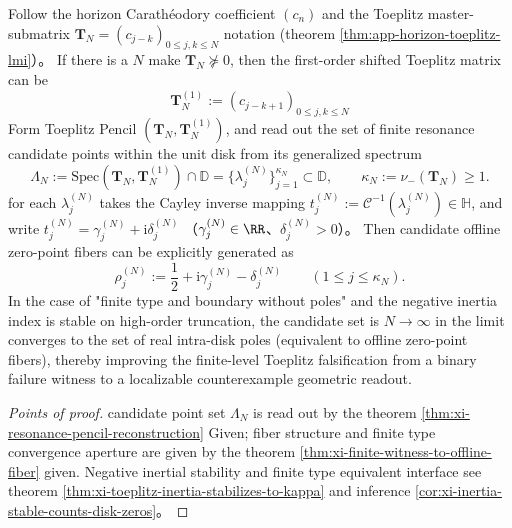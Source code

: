 \begin{conclusion}\label{con:xi-finite-falsifier-offline-fiber-readout}
Follow the horizon Carath\'eodory coefficient \((c_n)\) and the Toeplitz master-submatrix \(\mathbf{T}_N=(c_{j-k})_{0\le j,k\le N}\) notation (theorem \ref{thm:app-horizon-toeplitz-lmi}）。
If there is a \(N\) make \(\mathbf{T}_N\nsucceq 0\), then the first-order shifted Toeplitz matrix can be
\[
\mathbf{T}_N^{(1)}:=(c_{j-k+1})_{0\le j,k\le N}
\]
Form Toeplitz Pencil \((\mathbf{T}_N,\mathbf{T}_N^{(1)})\), and read out the set of finite resonance candidate points within the unit disk from its generalized spectrum
\[
\Lambda_N:=\mathrm{Spec}(\mathbf{T}_N,\mathbf{T}_N^{(1)})\cap\mathbb{D}
=\{\lambda^{(N)}_j\}_{j=1}^{\kappa_N}\subset\mathbb{D},
\qquad \kappa_N:=\nu_-(\mathbf{T}_N)\ge 1.
\]
for each \(\lambda^{(N)}_j\) takes the Cayley inverse mapping \(t^{(N)}_j:=\mathcal{C}^{-1}(\lambda^{(N)}_j)\in\mathbb{H}\), and write
\(
t^{(N)}_j=\gamma^{(N)}_j+\mathrm{i}\delta^{(N)}_j
\)
（\(\gamma^{(N)}_j\in\RR\)、\(\delta^{(N)}_j>0\)）。
Then candidate offline zero-point fibers can be explicitly generated as
\[
\boxed{\;
\rho^{(N)}_j:=\frac12+\mathrm{i}\gamma^{(N)}_j-\delta^{(N)}_j\qquad(1\le j\le \kappa_N).\;}
\]
In the case of "finite type and boundary without poles" and the negative inertia index is stable on high-order truncation, the candidate set is \(N\to\infty\) in the limit converges to the set of real intra-disk poles (equivalent to offline zero-point fibers), thereby improving the finite-level Toeplitz falsification from a binary failure witness to a localizable counterexample geometric readout.
\end{conclusion}
\begin{proof}[Points of proof]
candidate point set \(\Lambda_N\) is read out by the theorem \ref{thm:xi-resonance-pencil-reconstruction} Given; fiber structure and finite type convergence aperture are given by the theorem \ref{thm:xi-finite-witness-to-offline-fiber} given.
Negative inertial stability and finite type equivalent interface see theorem \ref{thm:xi-toeplitz-inertia-stabilizes-to-kappa} and inference \ref{cor:xi-inertia-stable-counts-disk-zeros}。
\end{proof}

